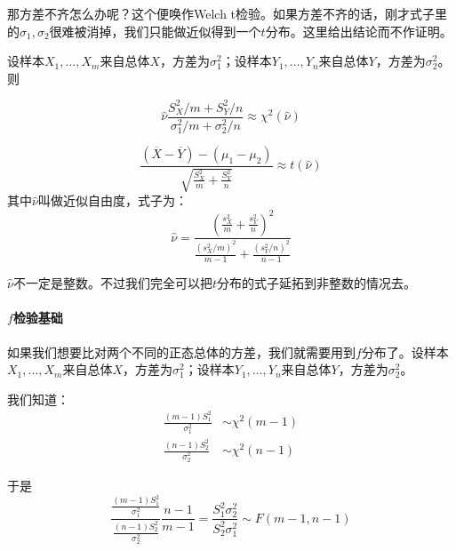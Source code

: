 那方差不齐怎么办呢？这个便唤作Welch t检验。如果方差不齐的话，刚才式子里的$\sigma_1,\sigma_2$很难被消掉，我们只能做近似得到一个$t$分布。这里给出结论而不作证明。

\begin{theorem}
设样本$X_1,\ldots,X_m$来自总体$X$，方差为$\sigma_1^2$；设样本$Y_1,\ldots,Y_n$来自总体$Y$，方差为$\sigma_2^2$。则

\[
\hat{\nu}\frac{S_X^2/m+S_Y^2/n}{\sigma_1^2/m+\sigma_2^2/n} \approx \chi^2(\hat{\nu})
\]

\[
\frac{(\overline{X}-\overline{Y})-(\mu_1-\mu_2)}{\sqrt{\frac{S_X^2}{m}+\frac{S_Y^2}{n}}}\approx t(\hat{\nu})
\]
其中$\hat{\nu}$叫做近似自由度，式子为：
\[
\hat{\nu}=\frac{\left(\frac{s_X^2}{m}+\frac{s_Y^2}{n}\right)^2}{\frac{(s_X^2/m)^2}{m-1}+\frac{(s_Y^2/n)^2}{n-1}}
\]
\end{theorem}

$\hat{\nu}$不一定是整数。不过我们完全可以把$t$分布的式子延拓到非整数的情况去。

\paragraph{$f$检验基础}
如果我们想要比对两个不同的正态总体的方差，我们就需要用到$f$分布了。设样本$X_1,\ldots,X_m$来自总体$X$，方差为$\sigma_1^2$；设样本$Y_1,\ldots,Y_n$来自总体$Y$，方差为$\sigma_2^2$。

我们知道：
\begin{align*}
\frac{(m-1)S_1^2}{\sigma_1^2}&\sim \chi^2(m-1)\\
\frac{(n-1)S_2^2}{\sigma_2^2}&\sim \chi^2(n-1)
\end{align*}

于是
\[
\frac{\frac{(m-1)S_1^2}{\sigma_1^2}}{\frac{(n-1)S_2^2}{\sigma_2^2}}\frac{n-1}{m-1}=\frac{S_1^2\sigma^2_2}{S^2_2\sigma_1^2} \sim F(m-1,n-1)
\]

